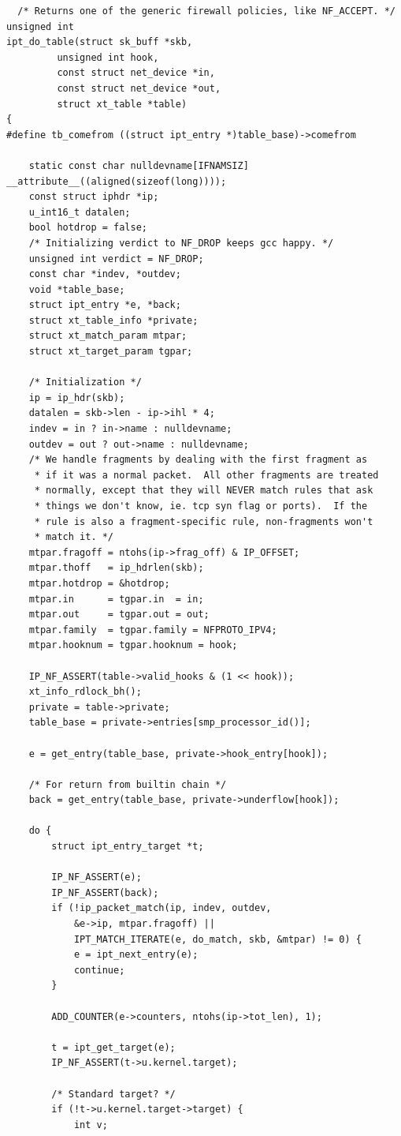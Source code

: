 \documentclass[a4paper,10pt]{article}
\begin{document}
\begin{lstlisting}
  /* Returns one of the generic firewall policies, like NF_ACCEPT. */
unsigned int
ipt_do_table(struct sk_buff *skb,
	     unsigned int hook,
	     const struct net_device *in,
	     const struct net_device *out,
	     struct xt_table *table)
{
#define tb_comefrom ((struct ipt_entry *)table_base)->comefrom

	static const char nulldevname[IFNAMSIZ] __attribute__((aligned(sizeof(long))));
	const struct iphdr *ip;
	u_int16_t datalen;
	bool hotdrop = false;
	/* Initializing verdict to NF_DROP keeps gcc happy. */
	unsigned int verdict = NF_DROP;
	const char *indev, *outdev;
	void *table_base;
	struct ipt_entry *e, *back;
	struct xt_table_info *private;
	struct xt_match_param mtpar;
	struct xt_target_param tgpar;

	/* Initialization */
	ip = ip_hdr(skb);
	datalen = skb->len - ip->ihl * 4;
	indev = in ? in->name : nulldevname;
	outdev = out ? out->name : nulldevname;
	/* We handle fragments by dealing with the first fragment as
	 * if it was a normal packet.  All other fragments are treated
	 * normally, except that they will NEVER match rules that ask
	 * things we don't know, ie. tcp syn flag or ports).  If the
	 * rule is also a fragment-specific rule, non-fragments won't
	 * match it. */
	mtpar.fragoff = ntohs(ip->frag_off) & IP_OFFSET;
	mtpar.thoff   = ip_hdrlen(skb);
	mtpar.hotdrop = &hotdrop;
	mtpar.in      = tgpar.in  = in;
	mtpar.out     = tgpar.out = out;
	mtpar.family  = tgpar.family = NFPROTO_IPV4;
	mtpar.hooknum = tgpar.hooknum = hook;

	IP_NF_ASSERT(table->valid_hooks & (1 << hook));
	xt_info_rdlock_bh();
	private = table->private;
	table_base = private->entries[smp_processor_id()];

	e = get_entry(table_base, private->hook_entry[hook]);

	/* For return from builtin chain */
	back = get_entry(table_base, private->underflow[hook]);

	do {
		struct ipt_entry_target *t;

		IP_NF_ASSERT(e);
		IP_NF_ASSERT(back);
		if (!ip_packet_match(ip, indev, outdev,
		    &e->ip, mtpar.fragoff) ||
		    IPT_MATCH_ITERATE(e, do_match, skb, &mtpar) != 0) {
			e = ipt_next_entry(e);
			continue;
		}

		ADD_COUNTER(e->counters, ntohs(ip->tot_len), 1);

		t = ipt_get_target(e);
		IP_NF_ASSERT(t->u.kernel.target);

		/* Standard target? */
		if (!t->u.kernel.target->target) {
			int v;


\end{lstlisting}
\end{document}
